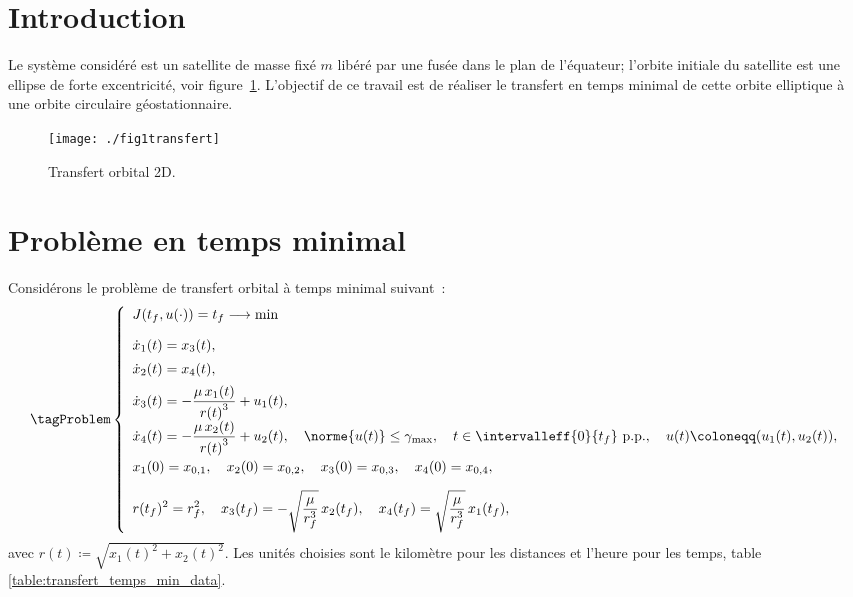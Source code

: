 \section{Introduction}

Le syst\`{e}me consid\'{e}r\'{e} est un satellite de masse fix\'{e} $m$ lib\'{e}r\'{e}
par une fus\'{e}e dans le plan de l'\'{e}quateur; l'orbite initiale du satellite est
une ellipse de forte excentricit\'{e}, voir figure~\ref{figtransfert}. L'objectif de ce travail est de r\'{e}aliser
le transfert en temps minimal de cette orbite elliptique \`{a} une orbite circulaire 
g\'{e}ostationnaire. 

\begin{figure}[ht!]
\centering
\texttt{[image: ./fig1transfert]}
\caption{\label{figtransfert}Transfert orbital 2D.}
\end{figure}

\section{Probl\`eme en temps minimal}

Consid\'erons le probl\`eme de transfert orbital \`a temps minimal suivant~:
\leqnomode
\begin{equation}\label{eq:transfert_temps_min}
    \tagProblem
        \left\{
            \begin{array}{l}
                \displaystyle J(t_f,u(\cdot)) = t_f \longrightarrow \min                                \\[1.0em]
                \displaystyle \dot{x}_1(t) = x_3(t), \\[0.5em]
                \displaystyle \dot{x}_2(t) = x_4(t), \\[0.5em]
                \displaystyle \dot{x}_3(t) = -\frac{\mu\, x_1(t)}{{r(t)}^3} + u_1(t), \\[0.5em]
                \displaystyle \dot{x}_4(t) = -\frac{\mu\, x_2(t)}{{r(t)}^3} + u_2(t),
                \quad \norme{u(t)} \le \gamma_\mathrm{max}, 
                \quad t \in \intervalleff{0}{t_f} \text{ p.p.}, \quad u(t) \coloneqq(u_1(t),u_2(t)),     \\[1.0em]
                \displaystyle x_1(0) = x_{0,1},   \quad x_2(0) = x_{0,2},  \quad x_3(0) = x_{0,3}, \quad x_4(0) = x_{0,4},  \\[1.0em]
                \displaystyle r(t_f)^2 = r_f^2, \quad
                \displaystyle x_3(t_f) = - \sqrt{\frac{\mu}{r_f^3}}\, x_2(t_f), \quad
                \displaystyle x_4(t_f) = \sqrt{\frac{\mu}{r_f^3}}\, x_1(t_f),
            \end{array} 
        \right.
\end{equation}
\reqnomode
avec $r(t) \coloneqq \sqrt{x_1(t)^2 + x_2(t)^2}$. Les unit\'es choisies sont le kilom\`etre pour les distances et l'heure pour les temps, \cf
table \ref{table:transfert_temps_min_data}.

